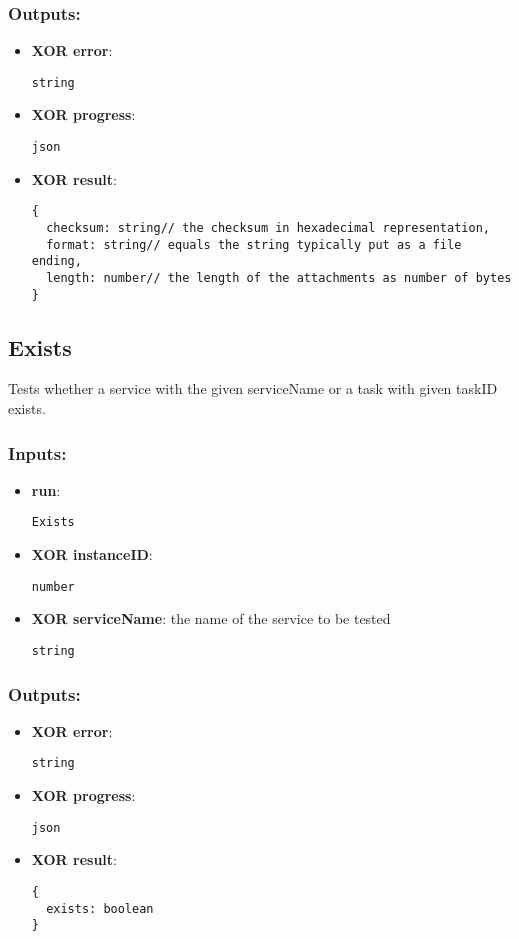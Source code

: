 \subsubsection*{Outputs:}
\begin{itemize}
    \item \textbf{XOR error}: 
\begin{lstlisting}
string
\end{lstlisting}
    \item \textbf{XOR progress}: 
\begin{lstlisting}
json
\end{lstlisting}
    \item \textbf{XOR result}: 
\begin{lstlisting}
{
  checksum: string// the checksum in hexadecimal representation, 
  format: string// equals the string typically put as a file ending, 
  length: number// the length of the attachments as number of bytes
}
\end{lstlisting}
  \end{itemize}

\subsection{Exists}
\label{ch:builtinservices:Exists}
Tests whether a service with the given serviceName or a task with given taskID exists.
\subsubsection*{Inputs:}
\begin{itemize}
    \item \textbf{run}: 
\begin{lstlisting}
Exists
\end{lstlisting}
    \item \textbf{XOR instanceID}: 
\begin{lstlisting}
number
\end{lstlisting}
    \item \textbf{XOR serviceName}: the name of the service to be tested
\begin{lstlisting}
string
\end{lstlisting}
  \end{itemize}

\subsubsection*{Outputs:}
\begin{itemize}
    \item \textbf{XOR error}: 
\begin{lstlisting}
string
\end{lstlisting}
    \item \textbf{XOR progress}: 
\begin{lstlisting}
json
\end{lstlisting}
    \item \textbf{XOR result}: 
\begin{lstlisting}
{
  exists: boolean
}
\end{lstlisting}
  \end{itemize}

